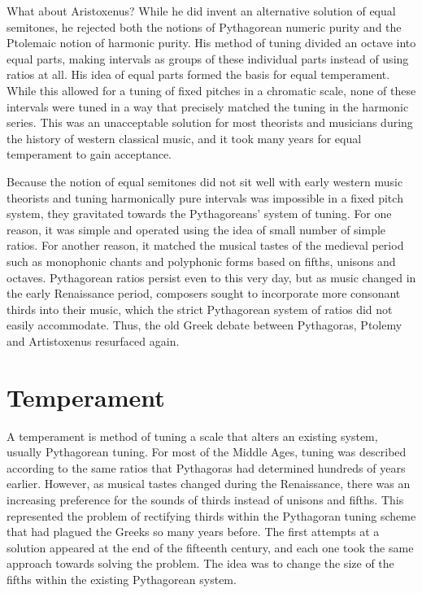 What about Aristoxenus?  While he did invent an alternative solution of equal semitones,
he rejected both the notions of Pythagorean numeric purity and the Ptolemaic notion of
harmonic purity.  His method of tuning divided an octave into equal parts, making
intervals as groups of these individual parts instead of using ratios at all.  His idea of
equal parts formed the basis for equal temperament.  While this allowed for a tuning of
fixed pitches in a chromatic scale, none of these intervals were tuned in a way that
precisely matched the tuning in the harmonic series.  This was an unacceptable solution
for most theorists and musicians during the history of western classical music, and it
took many years for equal temperament to gain acceptance.

Because the notion of equal semitones did not sit well with early western music theorists
and tuning harmonically pure intervals was impossible in a fixed pitch system, they
gravitated towards the Pythagoreans' system of tuning.  For one reason, it was simple and
operated using the idea of small number of simple ratios.  For another reason, it matched
the musical tastes of the medieval period such as monophonic chants and polyphonic forms
based on fifths, unisons and octaves.  Pythagorean ratios persist even to this very day,
but as music changed in the early Renaissance period, composers sought to incorporate more
consonant thirds into their music, which the strict Pythagorean system of ratios did not
easily accommodate.  Thus, the old Greek debate between Pythagoras, Ptolemy and
Artistoxenus resurfaced again.

\section{Temperament}

A temperament is method of tuning a scale that alters an existing system, usually
Pythagorean tuning. For most of the Middle Ages, tuning was described according to the
same ratios that Pythagoras had determined hundreds of years earlier. However, as musical
tastes changed during the Renaissance, there was an increasing preference for the sounds
of thirds instead of unisons and fifths. This represented the problem of rectifying thirds
within the Pythagoran tuning scheme that had plagued the Greeks so many years before. The
first attempts at a solution appeared at the end of the fifteenth century, and each one
took the same approach towards solving the problem.  The idea was to change the size of
the fifths within the existing Pythagorean system.

